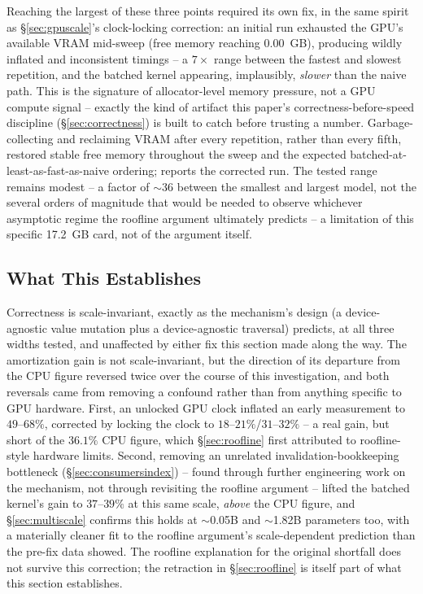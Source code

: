\documentclass{article}
\begin{document}
Reaching the largest of these three points required its own fix, in the same spirit as
\S\ref{sec:gpuscale}'s clock-locking correction: an initial run exhausted the GPU's available VRAM
mid-sweep (free memory reaching $0.00$~GB), producing wildly inflated and inconsistent timings -- a
$7\times$ range between the fastest and slowest repetition, and the batched kernel appearing,
implausibly, \emph{slower} than the naive path. This is the signature of allocator-level memory
pressure, not a GPU compute signal -- exactly the kind of artifact this paper's
correctness-before-speed discipline (\S\ref{sec:correctness}) is built to catch before trusting a
number. Garbage-collecting and reclaiming VRAM after every repetition, rather than every fifth,
restored stable free memory throughout the sweep and the expected
batched-at-least-as-fast-as-naive ordering;  reports the corrected run. The
tested range remains modest -- a factor of $\sim$36 between the smallest and largest model, not the
several orders of magnitude that would be needed to observe whichever asymptotic regime the
roofline argument ultimately predicts -- a limitation of this specific 17.2~GB card, not of the
argument itself.

\subsection{What This Establishes}

Correctness is scale-invariant, exactly as the mechanism's design (a device-agnostic value
mutation plus a device-agnostic traversal) predicts, at all three widths tested, and unaffected by
either fix this section made along the way. The amortization gain is not scale-invariant, but the
direction of its departure from the CPU figure reversed twice over the course of this
investigation, and both reversals came from removing a confound rather than from anything specific
to GPU hardware. First, an unlocked GPU clock inflated an early measurement to $49$--$68\%$,
corrected by locking the clock to $18$--$21\%$/$31$--$32\%$ -- a real gain, but short of the
$36.1\%$ CPU figure, which \S\ref{sec:roofline} first attributed to roofline-style hardware limits.
Second, removing an unrelated invalidation-bookkeeping bottleneck (\S\ref{sec:consumersindex}) --
found through further engineering work on the mechanism, not through revisiting the roofline
argument -- lifted the batched kernel's gain to $37$--$39\%$ at this same scale, \emph{above} the
CPU figure, and \S\ref{sec:multiscale} confirms this holds at $\sim$0.05B and $\sim$1.82B
parameters too, with a materially cleaner fit to the roofline argument's scale-dependent prediction
than the pre-fix data showed. The roofline explanation for the original shortfall does not survive
this correction; the retraction in \S\ref{sec:roofline} is itself part of what this section
establishes.
\end{document}
